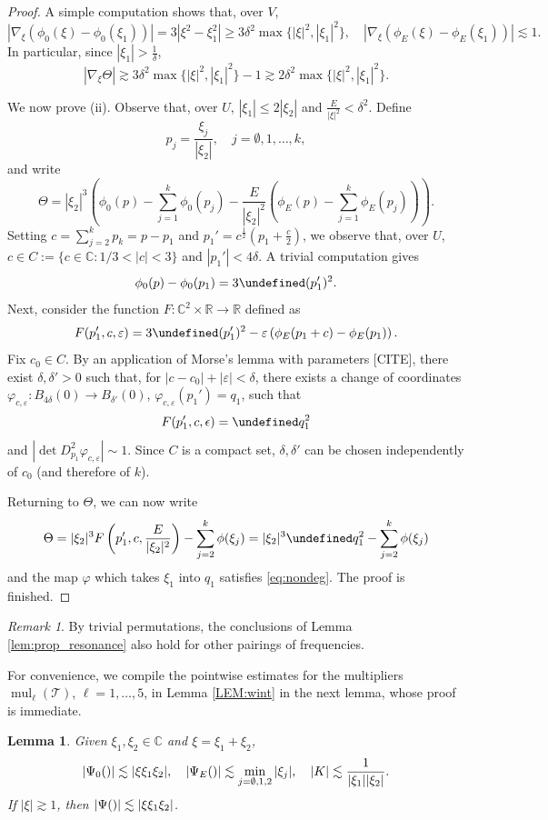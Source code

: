 \documentclass[a4paper,
11pt,  reqno]{amsart}
\makeatletter
\newcommand{\5}{\textup{V}}
\newcommand{\noi}{\noindent}
\newtheorem{lemma}[theorem]{Lemma}
\theoremstyle{remark}
\newtheorem{remark}[theorem]{Remark}
\newcommand{\R}{\mathbb{R}}
\newcommand{\CC}{\mathbb{C}}
\let\Re=\undefined\DeclareMathOperator*{\Re}{Re}
\newcommand{\TT}{\mathcal{T}}
\DeclareMathOperator{\mul}{mul}
\def\<#1>{\csname MH@symb@#1\endcsname}
\numberwithin{equation}{section}
\numberwithin{theorem}{section}
\makeatother
\begin{document}
\begin{proof}
A simple computation shows that, over $V$,
$$
|\nabla_\xi (\phi_0(\xi)-\phi_0(\xi_1))| = 3|\xi^2-\xi_1^2|\ge 3\delta^2\max\{|\xi|^2,|\xi_1|^2\},\quad |\nabla_\xi (\phi_E(\xi)-\phi_E(\xi_1))|\lesssim 1.
$$
In particular, since $|\xi_1|>\frac{1}{\delta}$,
$$
|\nabla_{\xi} \Theta|\gtrsim 3\delta^2\max\{|\xi|^2,|\xi_1|^2\} - 1 \gtrsim 2\delta^2\max\{|\xi|^2,|\xi_1|^2\}.
$$

\noi We now prove (ii). Observe that, over $U$, $|\xi_1|\le 2|\xi_2|$ and $\frac{E}{|\xi|^2}<\delta^2$. Define
$$
p_j=\frac{\xi_j}{|\xi_2|},\quad j=\emptyset, 1,\dots, k,
$$
and write
$$
\Theta=|\xi_2|^3\left(\phi_0(p) - \sum_{j=1}^k \phi_0(p_j) - \frac{E}{|\xi_2|^2}\left(\phi_E(p) - \sum_{j=1}^k \phi_E(p_j)\right)\right).
$$
Setting $c=\sum_{j=2}^kp_k=p-p_1$ and $p_1'=c^{\frac12}\left(p_1+\frac{c}{2}\right)$, we observe that, over $U$,  $c\in C:=\{c\in\CC: 1/3<|c|<3\}$ and $|p_1'|<4\delta$. A trivial computation gives
$$
\phi_0(p)-\phi_0(p_1) = 3\Re (p_1')^2.
$$
Next, consider the function $F:\CC^2\times \R\to \R$ defined as
$$
F(p_1', c, \varepsilon) = 3\Re (p_1')^2 - \varepsilon \left(\phi_E(p_1+c) - \phi_E(p_1)\right).
$$
Fix $c_0\in C$. By an application of Morse's lemma with parameters [CITE], there exist $\delta,\delta'>0$ such that, for $|c-c_0| + |\varepsilon|<\delta$, there exists a change of coordinates $\varphi_{c,\varepsilon}:B_{4\delta}(0)\to B_{\delta'}(0)$, $\varphi_{c,\varepsilon}(p_1')=q_1$, such that
$$
F(p_1', c, \epsilon) = \Re q_1^2
$$
and $|\det D^2_{p_1} \varphi_{c,\varepsilon}|\sim 1$. Since $C$ is a compact set, $\delta, \delta'$ can be chosen independently of $c_0$ (and therefore of $k$).

Returning to $\Theta$, we can now write
$$
\Theta = |\xi_2|^3 F\left(p_1', c, \frac{E}{|\xi_2|^2}\right) - \sum_{j=2}^k \phi(\xi_j) =  |\xi_2|^3\Re q_1^2 - \sum_{j=2}^k \phi(\xi_j) 
$$
and the map $\varphi$ which takes $\xi_1$ into $q_1$ satisfies \eqref{eq:nondeg}. The proof is finished.
\end{proof}
\begin{remark}
By trivial permutations, the conclusions of Lemma \ref{lem:prop_resonance} also hold for other pairings of frequencies.
\end{remark}


For convenience, we compile the pointwise estimates for the multipliers $\mul_\ell(\TT)$, $\ell=1,\dots,5$, in Lemma \ref{LEM:wint} in the next lemma, whose proof is immediate.

\begin{lemma}
Given $\xi_1,\xi_2\in\CC$ and $\xi=\xi_1+\xi_2$,
$$
|\Psi_0(\<1>)|\lesssim |\xi\xi_1\xi_2|,\quad  |\Psi_E(\<1>)|\lesssim \min_{j=\emptyset, 1,2}|\xi_j|,\quad |K|\lesssim \frac{1}{|\xi_1||\xi_2|}.
$$
If $|\xi|\gtrsim 1$, then $|\Psi(\<1>)|\lesssim |\xi\xi_1\xi_2|$.
\end{lemma}
\end{document}
